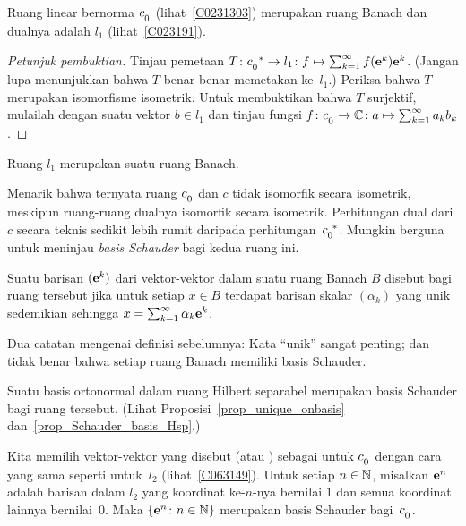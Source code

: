 \begin{exam}\label{exam_dual_C0} Ruang linear bernorma $c_{{}_{\scriptstyle{0}}}$ (lihat~\ref{C0231303})
merupakan ruang Banach dan dualnya adalah $l_1$ (lihat~\ref{C023191}).
\end{exam}

\begin{proof}[\emph{Petunjuk pembuktian}] Tinjau pemetaan
$T\colon {c_{{}_{\scriptstyle{0}}}}^* \rightarrow l_1\colon f \mapsto \sum_{k=1}^\infty f(\mathbf{e}^k)\mathbf{e}^k$.
(Jangan lupa menunjukkan bahwa $T$ benar-benar memetakan ke~$l_1$.) Periksa bahwa $T$ merupakan isomorfisme isometrik.
Untuk membuktikan bahwa $T$ surjektif, mulailah dengan suatu vektor $b \in l_1$ dan tinjau fungsi
$f\colon c_{{}_{\scriptstyle{0}}} \rightarrow \mathbb{C}\colon a \mapsto \sum_{k=1}^\infty a_kb_k$.    \ns
\end{proof}

\begin{cor} Ruang $l_1$ merupakan suatu
ruang Banach.
\end{cor}

Menarik bahwa ternyata ruang $c_{{}_{\scriptstyle{0}}}$ dan $c$ tidak isomorfik secara isometrik,
meskipun ruang-ruang dualnya isomorfik secara isometrik. Perhitungan dual dari $c$ secara teknis sedikit lebih rumit daripada
perhitungan~${c_{{}_{\scriptstyle{0}}}}^{\!*}$. Mungkin berguna untuk meninjau \emph{basis Schauder} bagi kedua ruang ini.

\begin{defn} Suatu barisan $(\mathbf{e}^k)$ dari vektor-vektor dalam suatu ruang Banach $B$ disebut
 bagi ruang tersebut jika untuk setiap $x \in B$ terdapat barisan skalar $(\alpha_k)$ yang unik
sedemikian sehingga $x = \sum_{k=1}^\infty \alpha_k \mathbf{e}^k$.
\end{defn}

Dua catatan mengenai definisi sebelumnya: Kata ``unik'' sangat penting; dan tidak benar bahwa
setiap ruang Banach memiliki basis Schauder.

\begin{exam} Suatu basis ortonormal dalam ruang Hilbert separabel merupakan basis Schauder bagi ruang tersebut. (Lihat
Proposisi~\ref{prop_unique_onbasis} dan~\ref{prop_Schauder_basis_Hsp}.)
\end{exam}

\begin{exam}\label{exam_dual_c0} Kita memilih
vektor-vektor yang disebut  (atau
) sebagai  untuk $c_{{}_{\scriptstyle{0}}}$ dengan cara yang sama seperti untuk~$l_2$ (lihat~\ref{C063149}).
Untuk setiap $n \in \mathbb{N}$, misalkan $\mathbf{e}^n$ adalah barisan dalam $l_2$ yang koordinat ke-$n$-nya bernilai $1$
dan semua koordinat lainnya bernilai~$0$. Maka $\{\mathbf{e}^n\colon n \in \mathbb{N}\}$ merupakan basis Schauder
bagi~$c_{{}_{\scriptstyle{0}}}$.
\end{exam}

